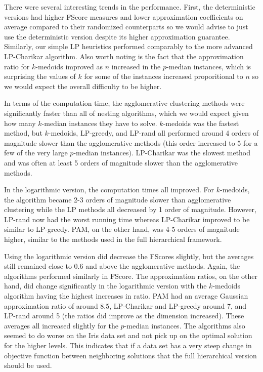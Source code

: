 \documentclass[conference, 10pt, final]{IEEEtran}
\begin{document}
There were several interesting trends in the performance. First, the deterministic versions had higher FScore measures and lower approximation coefficients on average compared to their randomized counterparts so we would advise to just use the deterministic version despite its higher approximation guarantee. Similarly, our simple LP heuristics performed comparably to the more advanced LP-Charikar algorithm. Also worth noting is the fact that the approximation ratio for $k$-medoids improved as $n$ increased in the $p$-median instances, which is surprising the values of $k$ for some of the instances increased proporitional to $n$ so we would expect the overall difficulty to be higher. 

In terms of the computation time, the agglomerative clustering methods were significantly faster than all of nesting algorithms, which we would expect given how many $k$-median instances they have to solve. $k$-medoids was the fastest method, but $k$-medoids, LP-greedy, and LP-rand all performed around 4 orders of magnitude slower than the agglomerative methods (this order increased to 5 for a few of the very large $p$-median instances). LP-Charikar was the slowest method and was often at least 5 orders of magnitude slower than the agglomerative methods. 

In the logarithmic version, the computation times all improved. For $k$-medoids, the algorithm became 2-3 orders of magnitude slower than agglomerative clustering while the LP methods all decreased by 1 order of magnitude. However, LP-rand now had the worst running time whereas LP-Charikar improved to be similar to LP-greedy. PAM, on the other hand, was 4-5 orders of magnitude higher, similar to the methods used in the full hierarchical framework. 

Using the logarithmic version did decrease the FScores slightly, but the averages still remained close to 0.6 and above the agglomerative methods. Again, the algorithms performed similarly in FScore. The approximation ratios, on the other hand, did change significantly in the logarithmic version with the $k$-medoids algorithm having the highest increases in ratio. PAM had an average Gaussian approximation ratio of around 8.5, LP-Charikar and LP-greedy around 7, and LP-rand around 5 (the ratios did improve as the dimension increased). These averages all increased slightly for the $p$-median instances. The algorithms also seemed to do worse on the Iris data set and not pick up on the optimal solution for the higher levels. This indicates that if a data set has a very steep change in objective function between neighboring solutions that the full hierarchical version should be used. 
\end{document}
